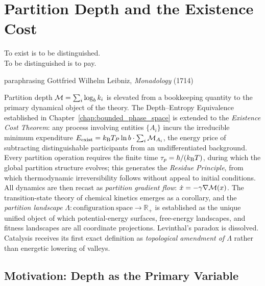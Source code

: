 
\chapter{Partition Depth and the Existence Cost}
\label{chap:partition_depth}

\epigraph{%
  To exist is to be distinguished.\\
  To be distinguished is to pay.%
}{paraphrasing Gottfried Wilhelm Leibniz, \textit{Monadology} (1714)}

\begin{chapterbox}
Partition depth $\mathcal{M} = \sum_i \log_b k_i$ is elevated from a bookkeeping
quantity to the primary dynamical object of the theory. The Depth--Entropy
Equivalence established in Chapter~\ref{chap:bounded_phase_space} is extended
to the \emph{Existence Cost Theorem}: any process involving entities
$\{A_i\}$ incurs the irreducible minimum expenditure
$E_{\mathrm{exist}} = k_{\mathrm{B}} T_P \ln b \cdot \sum_i \mathcal{M}_{A_i}$, the energy price of
subtracting distinguishable participants from an undifferentiated background.
Every partition operation requires the finite time $\tau_p = \hbar/(k_{\mathrm{B}} T)$,
during which the global partition structure evolves; this generates the
\emph{Residue Principle}, from which thermodynamic irreversibility follows
without appeal to initial conditions. All dynamics are then recast as
\emph{partition gradient flow}: $\dot{x} = -\gamma\nabla\mathcal{M}(x)$. The
transition-state theory of chemical kinetics emerges as a corollary, and the
\emph{partition landscape} $\Lambda: \mathrm{configuration\ space} \to \mathbb{R}_+$
is established as the unique unified object of which potential-energy surfaces,
free-energy landscapes, and fitness landscapes are all coordinate projections.
Levinthal's paradox is dissolved. Catalysis receives its first exact definition
as \emph{topological amendment of $\Lambda$} rather than energetic lowering of
valleys.
\end{chapterbox}

\section{Motivation: Depth as the Primary Variable}
\label{sec:depth_motivation}

